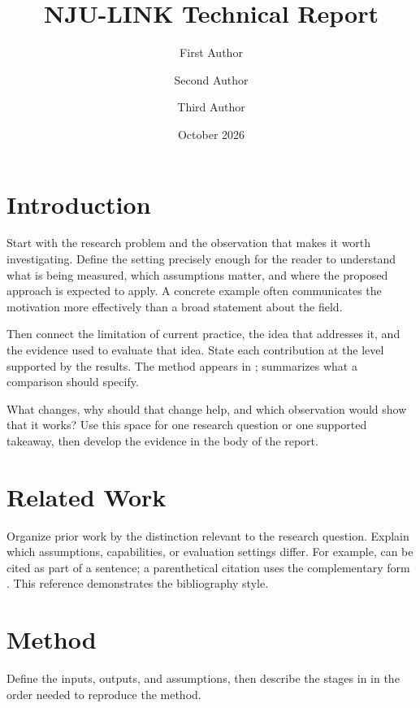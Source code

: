 \documentclass[10pt]{njulink}
\title{NJU-LINK Technical Report}
\author[1]{First Author}
\author[1,2]{Second Author}
\author[1]{Third Author}
\affiliation[1]{NJU-LINK}
\affiliation[2]{Affiliation Two}
\date{October 2026}
\begin{document}
\maketitle

\section{Introduction}
\label{sec:introduction}
Start with the research problem and the observation that makes it worth
investigating. Define the setting precisely enough for the reader to understand
what is being measured, which assumptions matter, and where the proposed
approach is expected to apply. A concrete example often communicates the
motivation more effectively than a broad statement about the field.

Then connect the limitation of current practice, the idea that addresses it,
and the evidence used to evaluate that idea. State each contribution at the
level supported by the results. The method appears in ;
 summarizes what a comparison should specify.

\begin{njubox}[title={The central question}]
What changes, why should that change help, and which observation would show
that it works? Use this space for one research question or one supported
takeaway, then develop the evidence in the body of the report.
\end{njubox}

\section{Related Work}
Organize prior work by the distinction relevant to the research question.
Explain which assumptions, capabilities, or evaluation settings differ.
For example, \citet{vaswani2017attention} can be cited as part of a sentence;
a parenthetical citation uses the complementary form
\citep{vaswani2017attention}. This reference demonstrates the bibliography style.

\section{Method}
\label{sec:method}
Define the inputs, outputs, and assumptions, then describe the stages
in  in the order needed to reproduce the method.
\end{document}
